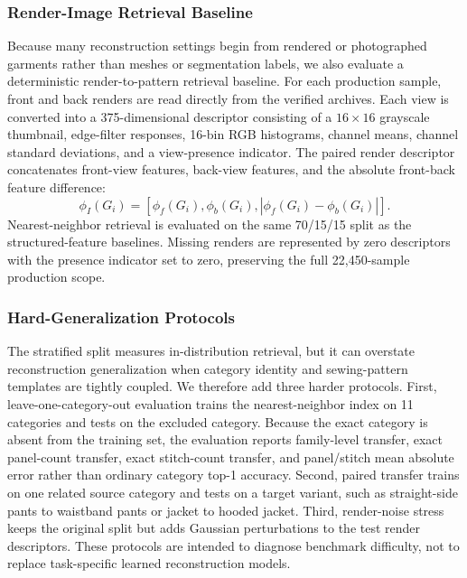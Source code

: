 \documentclass[pdflatex,sn-mathphys-num]{sn-jnl}
\begin{document}
\subsubsection{Render-Image Retrieval Baseline}

Because many reconstruction settings begin from rendered or photographed garments rather than meshes or segmentation labels, we also evaluate a deterministic render-to-pattern retrieval baseline. For each production sample, front and back renders are read directly from the verified archives. Each view is converted into a 375-dimensional descriptor consisting of a \(16\times16\) grayscale thumbnail, edge-filter responses, 16-bin RGB histograms, channel means, channel standard deviations, and a view-presence indicator. The paired render descriptor concatenates front-view features, back-view features, and the absolute front-back feature difference:
\begin{equation}
\phi_I(G_i)=\left[\phi_f(G_i),\phi_b(G_i),|\phi_f(G_i)-\phi_b(G_i)|\right].
\end{equation}
Nearest-neighbor retrieval is evaluated on the same 70/15/15 split as the structured-feature baselines. Missing renders are represented by zero descriptors with the presence indicator set to zero, preserving the full 22,450-sample production scope.

\subsubsection{Hard-Generalization Protocols}

The stratified split measures in-distribution retrieval, but it can overstate reconstruction generalization when category identity and sewing-pattern templates are tightly coupled. We therefore add three harder protocols. First, leave-one-category-out evaluation trains the nearest-neighbor index on 11 categories and tests on the excluded category. Because the exact category is absent from the training set, the evaluation reports family-level transfer, exact panel-count transfer, exact stitch-count transfer, and panel/stitch mean absolute error rather than ordinary category top-1 accuracy. Second, paired transfer trains on one related source category and tests on a target variant, such as straight-side pants to waistband pants or jacket to hooded jacket. Third, render-noise stress keeps the original split but adds Gaussian perturbations to the test render descriptors. These protocols are intended to diagnose benchmark difficulty, not to replace task-specific learned reconstruction models.
\end{document}
